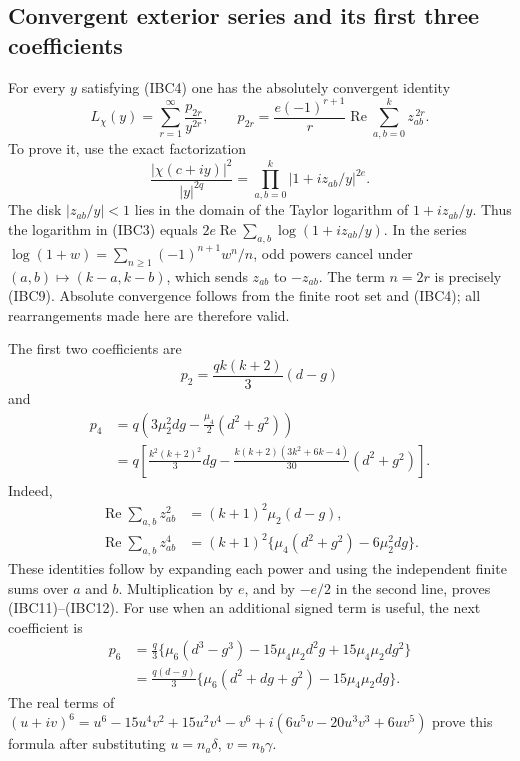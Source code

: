 \subsection{Convergent exterior series and its first three coefficients}

For every \(y\) satisfying (IBC4) one has the absolutely convergent
identity
\[
 L_\chi(y)=\sum_{r=1}^{\infty}\frac{p_{2r}}{y^{2r}},
 \qquad
 p_{2r}=\frac{e(-1)^{r+1}}{r}
             \operatorname{Re}\sum_{a,b=0}^{k}z_{ab}^{\,2r}.
 \tag{IBC9}
\]
To prove it, use the exact factorization
\[
 \frac{|\chi(c+iy)|^2}{|y|^{2q}}
 =\prod_{a,b=0}^{k}|1+i z_{ab}/y|^{2e}.
 \tag{IBC10}
\]
The disk \(|z_{ab}/y|<1\) lies in the domain of the Taylor logarithm of
\(1+i z_{ab}/y\).  Thus the logarithm in (IBC3) equals
\(2e\operatorname{Re}\sum_{a,b}\log(1+i z_{ab}/y)\).
In the series
\(\log(1+w)=\sum_{n\geq1}(-1)^{n+1}w^n/n\), odd powers cancel under
\((a,b)\mapsto(k-a,k-b)\), which sends \(z_{ab}\) to \(-z_{ab}\).
The term \(n=2r\) is precisely (IBC9).
Absolute convergence follows from the finite root set and (IBC4);
all rearrangements made here are therefore valid.

The first two coefficients are
\[
 p_2=\frac{qk(k+2)}3(d-g)
 \tag{IBC11}
\]
and
\[
 \begin{split}
 p_4
 &=q\left(3\mu_2^2dg-\frac{\mu_4}{2}(d^2+g^2)\right)\\
 &=q\left[
    \frac{k^2(k+2)^2}{3}dg
    -\frac{k(k+2)(3k^2+6k-4)}{30}(d^2+g^2)
   \right].
 \end{split}
 \tag{IBC12}
\]
Indeed,
\[
 \begin{split}
 \operatorname{Re}\sum_{a,b}z_{ab}^2
    &=(k+1)^2\mu_2(d-g),\\
 \operatorname{Re}\sum_{a,b}z_{ab}^4
    &=(k+1)^2\{\mu_4(d^2+g^2)-6\mu_2^2dg\}.
 \end{split}
 \tag{IBC13}
\]
These identities follow by expanding each power and using the independent
finite sums over \(a\) and \(b\).  Multiplication by \(e\), and by
\(-e/2\) in the second line, proves (IBC11)--(IBC12).
For use when an additional signed term is useful, the next coefficient is
\[
 \begin{split}
 p_6
  &=\frac q3\{\mu_6(d^3-g^3)
                   -15\mu_4\mu_2d^2g+15\mu_4\mu_2dg^2\}\\
  &=\frac{q(d-g)}3
       \{\mu_6(d^2+dg+g^2)-15\mu_4\mu_2dg\}.
 \end{split}
 \tag{IBC14}
\]
The real terms of
\((u+iv)^6=u^6-15u^4v^2+15u^2v^4-v^6
  +i(6u^5v-20u^3v^3+6uv^5)\)
prove this formula after substituting \(u=n_a\delta\), \(v=n_b\gamma\).

